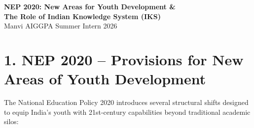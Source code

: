 \documentclass[11pt,a4paper]{article}
\begin{document}
\onehalfspacing

\begin{center}
  {\fontsize{12}{14}\selectfont\bfseries\color{navyblue}
  NEP 2020: New Areas for Youth Development \&\\[2pt]
  The Role of Indian Knowledge System (IKS)}\\[6pt]
  {\small\color{darkgray} Manvi \quad\textbar\quad AIGGPA Summer Intern 2026}
\end{center}

\vspace{0.2cm}

\section{1. NEP 2020 -- Provisions for New Areas of Youth Development}

The National Education Policy 2020 introduces several structural shifts designed to equip India's youth with 21st-century capabilities beyond traditional academic silos:
\end{document}
